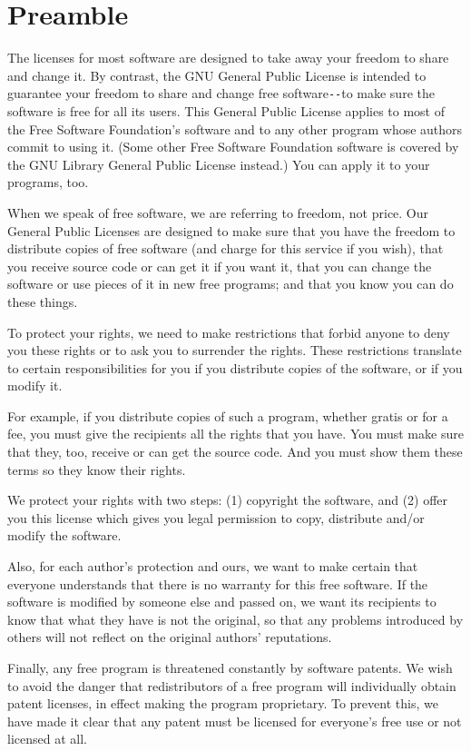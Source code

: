 \section{Preamble}
\label{SEC2}

The licenses for most software are designed to take away your freedom to share
and change it. By contrast, the GNU General Public License is intended to
guarantee your freedom to share and change free software\verb:--:to make sure the
software is free for all its users. This General Public License applies to
most of the Free Software Foundation's software and to any other program whose
authors commit to using it. (Some other Free Software Foundation software is
covered by the GNU Library General Public License instead.) You can apply it
to your programs, too.

When we speak of free software, we are referring to freedom, not price. Our
General Public Licenses are designed to make sure that you have the freedom to
distribute copies of free software (and charge for this service if you wish),
that you receive source code or can get it if you want it, that you can change
the software or use pieces of it in new free programs; and that you know you
can do these things.

To protect your rights, we need to make restrictions that forbid anyone to
deny you these rights or to ask you to surrender the rights. These
restrictions translate to certain responsibilities for you if you distribute
copies of the software, or if you modify it.

For example, if you distribute copies of such a program, whether gratis or for
a fee, you must give the recipients all the rights that you have. You must
make sure that they, too, receive or can get the source code. And you must
show them these terms so they know their rights.

We protect your rights with two steps: (1) copyright the software, and (2)
offer you this license which gives you legal permission to copy, distribute
and/or modify the software.

Also, for each author's protection and ours, we want to make certain that
everyone understands that there is no warranty for this free software. If the
software is modified by someone else and passed on, we want its recipients to
know that what they have is not the original, so that any problems introduced
by others will not reflect on the original authors' reputations.

Finally, any free program is threatened constantly by software patents. We
wish to avoid the danger that redistributors of a free program will
individually obtain patent licenses, in effect making the program proprietary.
To prevent this, we have made it clear that any patent must be licensed for
everyone's free use or not licensed at all.

